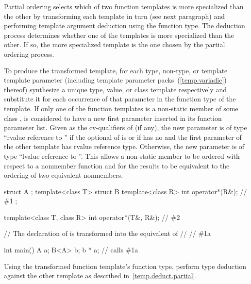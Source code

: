 \pnum
Partial ordering selects which of two function templates is more
specialized than the other by transforming each template in turn
(see next paragraph) and performing template argument deduction
using the function type.
The deduction process determines whether
one of the templates is more specialized than the other. If so, the
more specialized template is the one chosen by the partial ordering
process.

\pnum
To produce the transformed template, for each type, non-type, or template
template parameter (including template parameter packs~(\ref{temp.variadic})
thereof) synthesize a unique type, value, or class template
respectively and substitute it for each occurrence of that parameter
in the function type of the template.
If only one of the function templates  is a non-static
member of some class ,  is considered to have
a new first parameter inserted in its function
parameter list. Given \cv{} as the cv-qualifiers of 
(if any), the new parameter is of type ``rvalue reference to
\cv{} '' if the optional  of
 is \tcode{\&\&} or if  has no
 and the first parameter of the other
template has rvalue reference type. Otherwise, the new parameter is
of type ``lvalue reference to \cv{} ''.
\enternote This allows a non-static
member to be ordered with respect to a nonmember function and for the results
to be equivalent to the ordering of two equivalent nonmembers. \exitnote
\enterexample
\begin{codeblock}
struct A { };
template<class T> struct B {
  template<class R> int operator*(R&);              // \#1
};

template<class T, class R> int operator*(T&, R&);   // \#2

// The declaration of  is transformed into the equivalent of
// \quad\quad\quad// \#1a

int main() {
  A a;
  B<A> b;
  b * a;                                            // calls \#1a
}
\end{codeblock}
\exitexample

\pnum
Using the transformed function template's function type,
perform type deduction against the other template as described in~\ref{temp.deduct.partial}.

\enterexample

